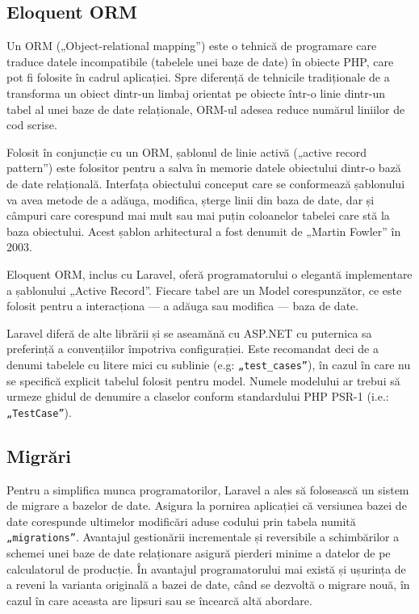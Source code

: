 	\subsection{Eloquent ORM}

		Un ORM („Object-relational mapping”) este o tehnică de programare care traduce datele incompatibile (tabelele unei baze de date) în obiecte PHP, care pot fi folosite în cadrul aplicației.
		Spre diferență de tehnicile tradiționale de a transforma un obiect dintr-un limbaj orientat pe obiecte într-o linie dintr-un tabel al unei baze de date relaționale, ORM-ul adesea reduce numărul liniilor de cod scrise.\cite{orm}

		Folosit în conjuncție cu un ORM, șablonul de linie activă („active record pattern”) este folositor pentru a salva în memorie datele obiectului dintr-o bază de date relațională.
		Interfața obiectului conceput care se conformează șablonului va avea metode de a adăuga, modifica, șterge linii din baza de date, dar și câmpuri care corespund mai mult sau mai puțin coloanelor tabelei care stă la baza obiectului.
		Acest șablon arhitectural a fost denumit de „Martin Fowler” în 2003.
		\cite{active_record}

		Eloquent ORM, inclus cu Laravel, oferă programatorului o elegantă implementare a șablonului „Active Record”.
		Fiecare tabel are un Model corespunzător, ce este folosit pentru a interacționa --- a adăuga sau modifica --- baza de date.

		Laravel diferă de alte librării și se aseamănă cu ASP.NET cu puternica sa preferință a convențiilor împotriva configurației.
		Este recomandat deci de a denumi tabelele cu litere mici cu sublinie (e.g: \verb|„test_cases”|), în cazul în care nu se specifică explicit tabelul folosit pentru model.
		Numele modelului ar trebui să urmeze ghidul de denumire a claselor conform standardului PHP PSR-1 \cite{psr_1} (i.e.: \verb|„TestCase”|).

	\subsection{Migrări}

		Pentru a simplifica munca programatorilor, Laravel a ales să folosească un sistem de migrare a bazelor de date.
		Asigura la pornirea aplicației că versiunea bazei de date corespunde ultimelor modificări aduse codului prin tabela numită \verb|„migrations”|.
		Avantajul gestionării incrementale și reversibile a schimbărilor a schemei unei baze de date relaționare asigură pierderi minime a datelor de pe calculatorul de producție.
		În avantajul programatorului mai există și ușurința de a reveni la varianta originală a bazei de date, când se dezvoltă o migrare nouă, în cazul în care aceasta are lipsuri sau se încearcă altă abordare.

